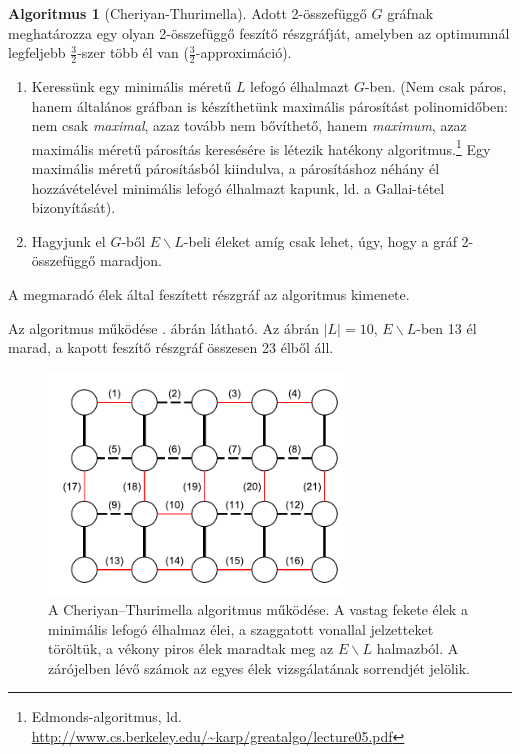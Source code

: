 \documentclass{article}
\theoremstyle{definition}
\newtheorem*{algoritmus}{Algoritmus}
\begin{document}
\begin{algoritmus}[Cheriyan-Thurimella]
Adott 2-összefüggő $G$ gráfnak meghatározza egy olyan 2-összefüggő feszítő részgráfját, amelyben az optimumnál legfeljebb  $\frac{3}{2}$-szer több él van ($\frac{3}{2}$-approximáció).

\begin{enumerate}
  \item Keressünk egy minimális méretű $L$ lefogó élhalmazt $G$-ben. (Nem csak páros, hanem általános gráfban is készíthetünk maximális párosítást polinomidőben: nem csak {\it maximal}, azaz tovább nem bővíthető, hanem {\it maximum}, azaz maximális méretű párosítás keresésére is létezik hatékony algoritmus.\footnote{Edmonds-algoritmus, ld. \url{http://www.cs.berkeley.edu/~karp/greatalgo/lecture05.pdf}} Egy maximális méretű párosításból kiindulva, a párosításhoz néhány él hozzávételével minimális lefogó élhalmazt kapunk, ld. a Gallai-tétel bizonyítását).  
  \item Hagyjunk el $G$-ből $E \backslash L$-beli éleket amíg csak lehet, úgy, hogy a gráf 2-összefüggő maradjon.
\end{enumerate}

A megmaradó élek által feszített részgráf az algoritmus kimenete.

Az algoritmus működése . ábrán látható. Az ábrán $|L| = 10$, $E \backslash L$-ben 13 él marad, a kapott feszítő részgráf összesen 23 élből áll.

\begin{figure}[h]
\centering
\includegraphics[width=80mm,keepaspectratio]{figures/cheriyan_thurimella_pelda.pdf}
\caption{A Cheriyan--Thurimella algoritmus működése. A vastag fekete élek a minimális lefogó élhalmaz élei, a szaggatott vonallal jelzetteket töröltük, a vékony piros élek maradtak meg az $E \backslash L$ halmazból. A zárójelben lévő számok az egyes élek vizsgálatának sorrendjét jelölik.}
\label{fig:cheriyan_thurimella_pelda}
\end{figure}
\end{algoritmus}

  
\end{document}
